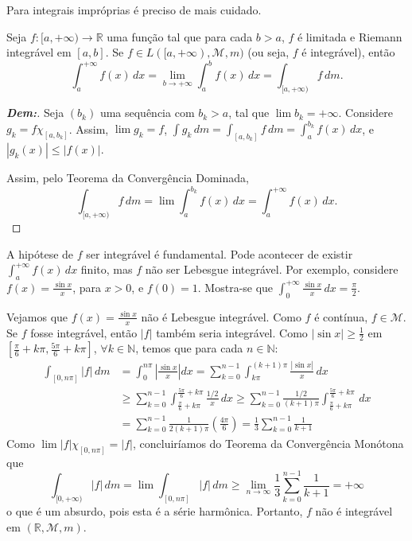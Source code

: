 Para integrais impróprias é preciso de mais cuidado.

\begin{prop*}{}
Seja $f: [a, +\infty) \rightarrow \mathbb{R}$ uma função tal que para cada $b > a$, $f$ é limitada e Riemann integrável em $[a,b]$. Se $f \in L([a, +\infty), \mathcal{M}, m)$ (ou seja, $f$ é integrável), então
$$ \int_a^{+\infty} f(x) \, dx = \lim_{b \rightarrow +\infty} \int_a^b f(x) \, dx = \int_{[a, +\infty)} f \, dm. $$
\end{prop*}

\begin{proof}[\textbf{Dem:}]
Seja $(b_k)$ uma sequência com $b_k > a$, tal que $\lim b_k = +\infty$. Considere $g_k = f \chi_{[a,b_k]}$. Assim, $\lim g_k = f$, $\int g_k \, dm = \int_{[a,b_k]} f \, dm = \int_a^{b_k} f(x) \, dx$, e $|g_k(x)| \le |f(x)|$.

Assim, pelo Teorema da Convergência Dominada,
$$ \int_{[a, +\infty)} f \, dm = \lim \int_a^{b_k} f(x) \, dx = \int_a^{+\infty} f(x) \, dx. $$
\end{proof}

A hipótese de $f$ ser integrável é fundamental. Pode acontecer de existir $\int_a^{+\infty} f(x) \, dx$ finito, mas $f$ não ser Lebesgue integrável. Por exemplo, considere $f(x) = \frac{\sin x}{x}$, para $x > 0$, e $f(0)=1$. Mostra-se que $\int_0^{+\infty} \frac{\sin x}{x} \, dx = \frac{\pi}{2}$.

Vejamos que $f(x) = \frac{\sin x}{x}$ não é Lebesgue integrável. Como $f$ é contínua, $f \in \mathcal{M}$. Se $f$ fosse integrável, então $|f|$ também seria integrável. Como $|\sin x| \ge \frac{1}{2}$ em $\left[ \frac{\pi}{6} + k\pi, \frac{5\pi}{6} + k\pi \right]$, $\forall k \in \mathbb{N}$, temos que para cada $n \in \mathbb{N}$:
\begin{align*}
    \int_{[0, n\pi]} |f| \, dm &= \int_0^{n\pi} \left| \frac{\sin x}{x} \right| dx = \sum_{k=0}^{n-1} \int_{k\pi}^{(k+1)\pi} \frac{|\sin x|}{x} \, dx \\
    &\ge \sum_{k=0}^{n-1} \int_{\frac{\pi}{6}+k\pi}^{\frac{5\pi}{6}+k\pi} \frac{1/2}{x} \, dx \ge \sum_{k=0}^{n-1} \frac{1/2}{(k+1)\pi} \int_{\frac{\pi}{6}+k\pi}^{\frac{5\pi}{6}+k\pi} \, dx \\
    &= \sum_{k=0}^{n-1} \frac{1}{2(k+1)\pi} \left( \frac{4\pi}{6} \right) = \frac{1}{3} \sum_{k=0}^{n-1} \frac{1}{k+1}
\end{align*}
Como $\lim |f| \chi_{[0, n\pi]} = |f|$, concluiríamos do Teorema da Convergência Monótona que
$$ \int_{[0, +\infty)} |f| \, dm = \lim \int_{[0, n\pi]} |f| \, dm \ge \lim_{n \rightarrow \infty} \frac{1}{3} \sum_{k=0}^{n-1} \frac{1}{k+1} = +\infty $$
o que é um absurdo, pois esta é a série harmônica. Portanto, $f$ não é integrável em $(\mathbb{R}, \mathcal{M}, m)$.
